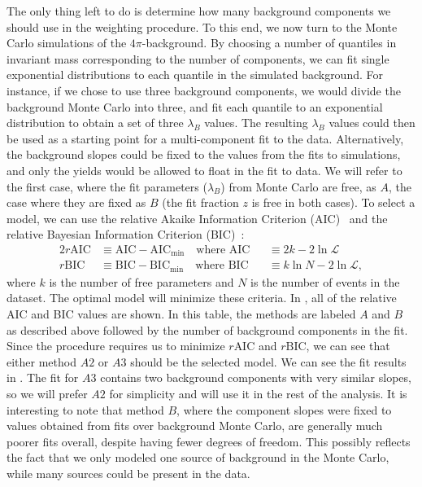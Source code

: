 The only thing left to do is determine how many background components we should use in the weighting procedure. To this end, we now turn to the Monte Carlo simulations of the $4\pi$-background. By choosing a number of quantiles in invariant mass corresponding to the number of components, we can fit single exponential distributions to each quantile in the simulated background. For instance, if we chose to use three background components, we would divide the background Monte Carlo into three, and fit each quantile to an exponential distribution to obtain a set of three $\lambda_B$ values. The resulting  $\lambda_B$ values could then be used as a starting point for a multi-component fit to the data. Alternatively, the background slopes could be fixed to the values from the fits to simulations, and only the yields would be allowed to float in the fit to data. We will refer to the first case, where the fit parameters ($\lambda_B$) from Monte Carlo are free, as $A$, the case where they are fixed as $B$ (the fit fraction $z$ is free in both cases). To select a model, we can use the relative Akaike Information Criterion (AIC)~\cite{Akaike1998} and the relative Bayesian Information Criterion (BIC)~\cite{Schwarz1978}:
\begin{alignat}{2}
  r\text{AIC} &\equiv \text{AIC} - \text{AIC}_\text{min} \quad\text{where } \text{AIC} &&\equiv 2k - 2\ln\mathcal{L} \\
  r\text{BIC} &\equiv \text{BIC} - \text{BIC}_\text{min} \quad\text{where } \text{BIC} &&\equiv k\ln{N} - 2\ln\mathcal{L},
  \label{eq:information-criteria}
\end{alignat}
where $k$ is the number of free parameters and $N$ is the number of events in the dataset. The optimal model will minimize these criteria. In , all of the relative AIC and BIC values are shown. In this table, the methods are labeled $A$ and $B$ as described above followed by the number of background components in the fit. Since the procedure requires us to minimize $r\text{AIC}$ and $r\text{BIC}$, we can see that either method $A2$ or $A3$ should be the selected model. We can see the fit results in . The fit for $A3$ contains two background components with very similar slopes, so we will prefer $A2$ for simplicity and will use it in the rest of the analysis. It is interesting to note that method $B$, where the component slopes were fixed to values obtained from fits over background Monte Carlo, are generally much poorer fits overall, despite having fewer degrees of freedom. This possibly reflects the fact that we only modeled one source of background in the Monte Carlo, while many sources could be present in the data.

